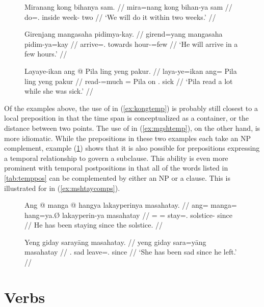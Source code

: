 \begin{figure}[h]
\pex
\a\label{ex:kongtemp}\begingl
	\gla Miranang kong bihanya sam. //
	\glb mira=nang kong bihan-ya sam //
	\glc do=\Fpl{}.\Aarg{} inside week-\Loc{} two //
	\glft `We will do it within two weeks.' //
\endgl

\a\label{ex:mgshtemp}\begingl
	\gla Girenjang mangasaha pidimya-kay. //
	\glb girend=yang mangasaha pidim-ya=kay //
	\glc arrive=\TsgM{}.\Aarg{} towards hour-\Loc{}=few //
	\glft `He will arrive in a few hours.' //
\endgl

\a\label{ex:lingtemp}\begingl
	\gla Layaye-ikan ang @ Pila ling yeng pakur. //
	\glb laya-ye=ikan ang= Pila ling yeng pakur //
	\glc read-\TsgF{}=much \Aarg{}= Pila on \TsgF{}.\Aarg{} sick //
	\glft `Pila read a lot while she was sick.' //
\endgl
\xe
\end{figure}

Of the examples above, the use of  in (\ref{ex:kongtemp}) is
probably still closest to a local preposition in that the time span is
conceptualized as a container, or the distance between two points. The use of
 in (\ref{ex:mgshtemp}), on the other hand, is more
idiomatic. While the prepositions in these two examples each take an NP
complement, example (\ref{ex:lingtemp}) shows that it is also possible for
prepositions expressing a temporal relationship to govern a subclause. This
ability is even more prominent with temporal postpositions in that all of the
words listed in \autoref{tab:temppos} can be complemented by either an NP or a
clause. This is illustrated for  in
(\ref{ex:mshtaycomps}).

\begin{figure}[h]
\pex\label{ex:mshtaycomps}
\a\label{ex:mshtaynp}\begingl
	\gla Ang @ manga @ hangya lakayperinya masahatay. //
	\glb ang= manga= hang=ya.Ø lakayperin-ya masahatay //
	\glc \AgtT{}= \Prog{}= stay=\TsgM{}.\Top{} solstice-\Loc{} since //
	\glft He has been staying since the solstice. //
\endgl

\a\label{ex:mshtays}\begingl
	\gla Yeng giday sarayāng masahatay. //
	\glb yeng giday sara=yāng masahatay //
	\glc \TsgF{}.\Aarg{} sad leave=\TsgM{}.\Aarg{} since //
	\glft `She has been sad since he left.' //
\endgl
\xe
\end{figure}


\section{Verbs}
\label{sec:verbs}

